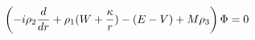 \begin{equation}
\left(-i\rho_2{d\over dr} +\rho_1(W+{\kappa\over r})-(E-V)+M\rho_3\right)\Phi=0
\end{equation}

